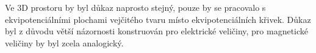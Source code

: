         Ve 3D prostoru by byl důkaz naprosto stejný, pouze by se pracovalo s ekvipotenciálními 
        plochami vejčitého tvaru místo ekvipotenciálních křivek. Důkaz byl z důvodu větší 
        názornosti konstruován pro elektrické veličiny, pro magnetické veličiny by byl zcela 
        analogický.

\printbibliography[title={Seznam literatury}, heading=subbibliography]
